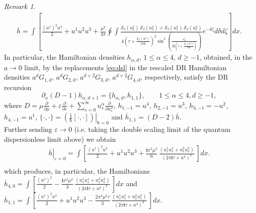 \documentclass{amsart}
\numberwithin{equation}{section} %
\theoremstyle{plain}
\theoremstyle{remark}
\newtheorem{remark}[theorem]{Remark}
\def\cxi{\mathbf{i}}
\begin{document}
\begin{remark}
\begin{align*}
\overline{h} =  \int \left[ \frac{(u^1)^2 u^4}{2} + u^1 u^2 u^3 + \frac{\mu^2}{4\pi} 
\oint\!\!\int
\frac{\mathcal{S}_{\delta} ( u^1_x) \,\mathcal{S}_{\delta}( u^4_x) +\mathcal{S}_{\delta}( u^2_x)\,\mathcal{S}_{\delta}( u^3_x)}{4\left(\tau+\frac{\mathcal{S}_{\delta} (u^4) }{2 \pi \cxi}\right)^2 \sin^2\left(\frac{\varepsilon \zeta}{2\cxi\left(\tau+\frac{\mathcal{S}_{\delta} (u^4) }{2 \pi \cxi}\right)}\right)} e^{-\delta\zeta}	d\delta d\zeta \right]dx.
\end{align*}
In particular, the Hamiltonian densities $h_{\alpha,d}$, $1\leq\alpha\leq 4$, $d\geq -1$, obtained, in the $a \to 0$ limit, by the replacements \eqref{eq:dsl} in the rescaled DR Hamiltonian densities $a^d G_{1,d}$, $a^d G_{2,d}$, $a^{d+2}G_{3,d}$, $a^{d+2}G_{4,d}$, respectively, satisfy the DR recursion
$$\partial_x (D-1) h_{\alpha,d+1} = \{h_{\alpha,d},h_{1,1}\}, \qquad 1\leq\alpha\leq 4, d\geq -1,$$
where $D=\mu\frac{\partial}{\partial \mu} + \varepsilon \frac{\partial}{\partial \varepsilon}  + \sum_{s=0}^\infty u^{\alpha}_s \frac{\partial}{\partial u^{\alpha}_s}$, $h_{1,-1}=u^4$, $h_{2,-1}=u^3$, $h_{3,-1}=-u^2$, $h_{4,-1}=u^1$, $\{\cdot,\cdot\} = \left.\left(\frac{1}{\hbar}[\cdot,\cdot]\right)\right|_{\hbar=0}$ and $\overline{h}_{1,1} = (D-2) \overline{h}$.\\
Further sending $\varepsilon \to 0$ (i.e. taking the double scaling limit of the quantum dispersionless limit above) we obtain
\begin{align*}
\left.\overline{h}\right|_{\varepsilon=0} = \int \left[ \frac{(u^1)^2 u^4}{2} + u^1 u^2 u^3  +\frac{\cxi \pi^2 \mu^2}{6}\,  \frac{(u^1_x u^4_x +  u^2_x u^3_x)}{\left(2 \pi \cxi\tau+u^4\right)^2}\, \right]dx.\\
\end{align*}
which produces, in particular, the Hamiltonians
$\overline{h}_{4,0} = \int\left[\frac{(u^1)^2}{2} -\frac{\cxi \pi^2 \mu^2}{3}\,  \frac{(u^1_x u^4_x +  u^2_x u^3_x)}{\left(2 \pi \cxi\tau+u^4\right)^3}\, \right]dx$ and $\overline{h}_{1,1}=\int \left[ \frac{(u^1)^2 u^4}{2} + u^1 u^2 u^3  -\frac{2 \pi^3 \mu^2 \tau}{3}\,  \frac{(u^1_x u^4_x +  u^2_x u^3_x)}{\left(2 \pi \cxi\tau+u^4\right)^3}\, \right]dx$.
\end{remark}

\printbibliography
\end{document}
